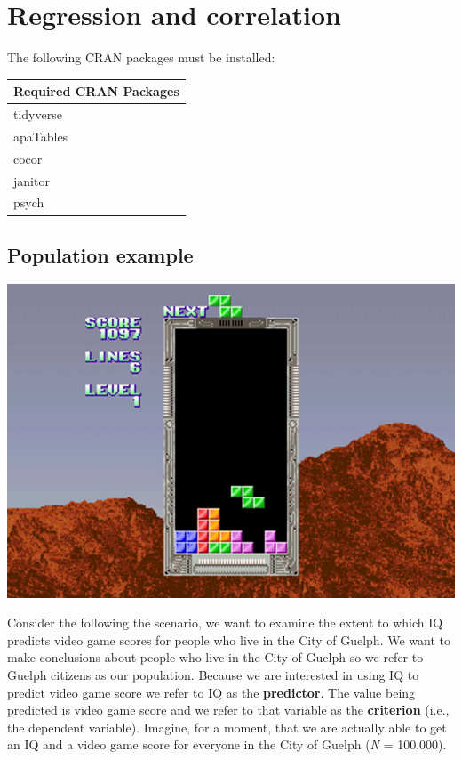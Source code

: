 \documentclass[
]{krantz}
\begin{document}
\hypertarget{regression-and-correlation}{%
\chapter{Regression and correlation}\label{regression-and-correlation}}

The following CRAN packages must be installed:

\begin{longtable}[]{@{}l@{}}
\toprule
Required CRAN Packages \\
\midrule
\endhead
tidyverse \\
apaTables \\
cocor \\
janitor \\
psych \\
\bottomrule
\end{longtable}

\hypertarget{population-example}{%
\section{Population example}\label{population-example}}

\includegraphics[width=8.89in]{ch_correlation/images/tetris}

Consider the following the scenario, we want to examine the extent to which IQ predicts video game scores for people who live in the City of Guelph. We want to make conclusions about people who live in the City of Guelph so we refer to Guelph citizens as our population. Because we are interested in using IQ to predict video game score we refer to IQ as the \textbf{predictor}. The value being predicted is video game score and we refer to that variable as the \textbf{criterion} (i.e., the dependent variable). Imagine, for a moment, that we are actually able to get an IQ and a video game score for everyone in the City of Guelph (\emph{N} = 100,000).
\end{document}
